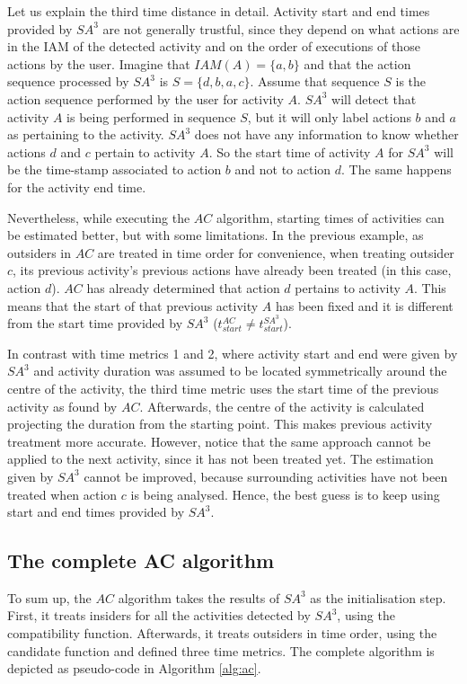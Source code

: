 Let us explain the third time distance in detail. Activity start and end times provided by $SA^3$ are not generally trustful, since they depend on what actions are in the IAM of the detected activity and on the order of executions of those actions by the user. Imagine that $IAM(A)=\{a, b\}$ and that the action sequence processed by $SA^3$ is $S=\{d, b, a, c\}$. Assume that sequence $S$ is the action sequence performed by the user for activity $A$. $SA^3$ will detect that activity $A$ is being performed in sequence $S$, but it will only label actions $b$ and $a$ as pertaining to the activity. $SA^3$ does not have any information to know whether actions $d$ and $c$ pertain to activity $A$. So the start time of activity $A$ for $SA^3$ will be the time-stamp associated to action $b$ and not to action $d$. The same happens for the activity end time.

Nevertheless, while executing the $AC$ algorithm, starting times of activities can be estimated better, but with some limitations. In the previous example, as outsiders in $AC$ are treated in time order for convenience, when treating outsider $c$, its previous activity's previous actions have already been treated (in this case, action $d$). $AC$ has already determined that action $d$ pertains to activity $A$. This means that the start of that previous activity $A$ has been fixed and it is different from the start time provided by $SA^3$ ($t_{start} ^{AC} \neq t_{start} ^{SA^3}$).

In contrast with time metrics 1 and 2, where activity start and end were given by $SA^3$ and activity duration was assumed to be located symmetrically around the centre of the activity, the third time metric uses the start time of the previous activity as found by $AC$. Afterwards, the centre of the activity is calculated projecting the duration from the starting point. This makes previous activity treatment more accurate. However, notice that the same approach cannot be applied to the next activity, since it has not been treated yet. The estimation given by $SA^3$ cannot be improved, because surrounding activities have not been treated when action $c$ is being analysed. Hence, the best guess is to keep using start and end times provided by $SA^3$.

\subsection{The complete AC algorithm}

To sum up, the $AC$ algorithm takes the results of $SA^3$ as the initialisation step. First, it treats insiders for all the activities detected by $SA^3$, using the compatibility function. Afterwards, it treats outsiders in time order, using the candidate function and defined three time metrics. The complete algorithm is depicted as pseudo-code in Algorithm \ref{alg:ac}.

